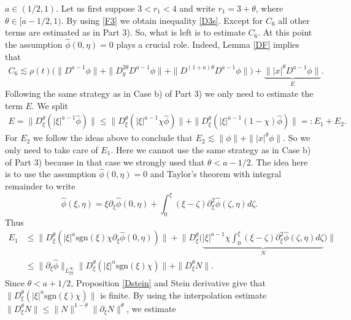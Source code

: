 \documentclass[reqno]{amsart}
\newcommand{\ha}{\hat{\phi}}
\newcommand{\p}{\partial}
\newcommand{\sgn}{\text{sgn}}
\numberwithin{equation}{section}
\begin{document}
 $a\in (1/2,1)$. Let us first suppose $3<r_1<4$ and write $r_1=3+\theta$, where $\theta\in [a-1/2,1)$. By using \eqref{F3} we obtain inequality \eqref{D3s}. Except for $C_6$ all other terms are estimated as in Part 3). So, what is left is to estimate $C_6$. At this point the assumption $\hat{\phi}(0,\eta)=0$ plays a crucial role. Indeed, 
Lemma \ref{DF} implies that
\begin{equation}
\begin{split}\label{c61}
C_6\lesssim \rho(t)\big(\|D^{a-1}\phi\|+\|D_y^{2\theta}D^{a-1}\phi\|+\|D^{(1+a)\theta}D^{a-1}\phi\|\big)+\underbrace{\||x|^\theta D^{a-1}\phi\|}_{E}.
\end{split}
\end{equation}
Following the same strategy as in Case b) of Part 3) we only need to estimate the term $E$. We split
\begin{equation}
\begin{split}\label{c6M1}
E=\|D^{\theta}_\xi (|\xi|^{a-1}\hat{\phi})\|
                           \leq \|D^{\theta}_\xi (|\xi|^{a-1}\chi\hat{\phi})\|+\|D^{\theta}_\xi (|\xi|^{a-1} (1-\chi)\hat{\phi})\|
                           =: E_1+E_2.
\end{split}
\end{equation}
For $E_2$ we follow the ideas above to conclude that $E_2 \lesssim \|\phi\|+\||x|^\theta \phi\|$. So we only need to take care of $E_1$. Here we cannot use the same strategy as in Case b) of Part 3) because in that case we strongly used that $\theta<a-1/2$. The idea here is to use the assumption $\hat{\phi}(0,\eta)=0$ and Taylor's theorem with integral remainder to write
\begin{equation}\label{taylor}
\hat{\phi}(\xi,\eta)=\xi \partial_\xi \hat{\phi}(0,\eta)+\int_0^\xi (\xi-\zeta)\partial_\xi ^2 \hat{\phi}(\zeta,\eta)d\zeta.
\end{equation}
Thus
\begin{equation*}
\begin{split}
E_1&\leq \|D_\xi^\theta (|\xi|^{a}\sgn(\xi)\chi\partial_\xi \hat{\phi}(0,\eta))\|+\Big\|D_\xi^\theta\Big(\underbrace{|\xi|^{a-1}\chi\int_0^\xi (\xi-\zeta)\partial_\xi ^2 \hat{\phi}(\zeta,\eta)d\zeta}_{N}\Big)\Big\|\\
&\leq \|\p_\xi \ha\|_{L^\infty_{\xi \eta}}\|D_\xi^\theta (|\xi|^{a}\sgn(\xi)\chi)\|+\|D_\xi^\theta N\|.
\end{split}
\end{equation*}
Since $\theta<a+1/2$, Proposition \ref{Dstein} and Stein derivative give that $\|D^\theta_\xi (|\xi|^a \sgn(\xi) \chi)\|$ is finite. By using the interpolation estimate $\|D_\xi^\theta N\|\leq \|N\|^{1-\theta}\|\p_\xi N\|^\theta$, we estimate
\end{document}
